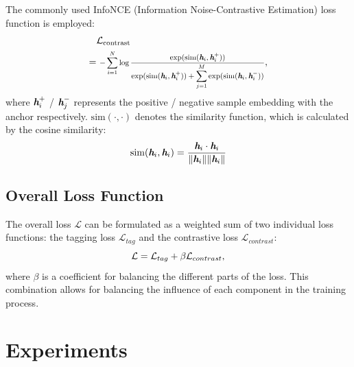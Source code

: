 \documentclass[11pt]{article}
\begin{document}
The commonly used InfoNCE (Information Noise-Contrastive Estimation) loss function \cite{oord2019representation} is employed:
\begin{align}
\setlength{\abovedisplayskip}{0pt}
\setlength{\belowdisplayskip}{0pt}
 & \scalebox{1}{$\mathcal{L}_{\text{contrast}}$} \notag \\
=& \ \scalebox{0.8}{$-\displaystyle\sum_{i=1}^{N} \log \frac{\exp(\text{sim}(\textit{\textbf{h}}_i, \textit{\textbf{h}}_i^+))}{\exp(\text{sim}(\textit{\textbf{h}}_i, \textit{\textbf{h}}_i^+)) + \displaystyle\sum_{j=1}^{M} \exp(\text{sim}(\textit{\textbf{h}}_i, \textit{\textbf{h}}_i^-))} $}, 
\end{align}
where $\textit{\textbf{h}}_i^+$ / $\textit{\textbf{h}}_j^-$ represents the positive / negative sample embedding with the anchor respectively. $\text{sim}(\cdot, \cdot)$ denotes the similarity function, which is calculated by the cosine similarity:
\begin{equation}
\setlength{\abovedisplayskip}{2pt}
\setlength{\belowdisplayskip}{2pt}
\text{sim}(\textit{\textbf{h}}_i, \textit{\textbf{h}}_i) = \frac{\textit{\textbf{h}}_i \cdot \textit{\textbf{h}}_i}{\|\textit{\textbf{h}}_i\| \|\textit{\textbf{h}}_i\|}
\end{equation}


\subsection{Overall Loss Function}

The overall loss \( \mathcal{L} \) can be formulated as a weighted sum of two individual loss functions: the tagging loss \( \mathcal{L}_{tag} \) and the contrastive loss \( \mathcal{L}_{contrast} \):
\begin{equation}
\setlength{\abovedisplayskip}{2pt}
\setlength{\belowdisplayskip}{2pt}
    \mathcal{L} = \mathcal{L}_{tag} + \beta \mathcal{L}_{contrast}, 
\label{eq:overall_loss}
\end{equation}
where $\beta$ is a coefficient for balancing the different parts of the loss.
This combination allows for balancing the influence of each component in the training process.

\section{Experiments}
\end{document}
